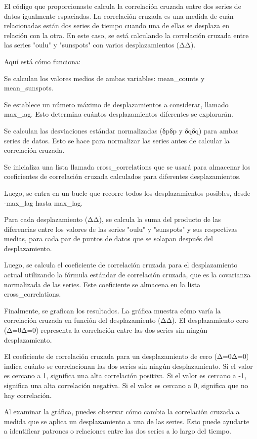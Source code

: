 El código que proporcionaste calcula la correlación cruzada entre dos series de datos igualmente espaciadas. La correlación cruzada es una medida de cuán relacionadas están dos series de tiempo cuando una de ellas se desplaza en relación con la otra. En este caso, se está calculando la correlación cruzada entre las series "oulu" y "sunspots" con varios desplazamientos (ΔΔ).

Aquí está cómo funciona:

    Se calculan los valores medios de ambas variables: mean_counts y mean_sunspots.

    Se establece un número máximo de desplazamientos a considerar, llamado max_lag. Esto determina cuántos desplazamientos diferentes se explorarán.

    Se calculan las desviaciones estándar normalizadas (δpδp​ y δqδq​) para ambas series de datos. Esto se hace para normalizar las series antes de calcular la correlación cruzada.

    Se inicializa una lista llamada cross_correlations que se usará para almacenar los coeficientes de correlación cruzada calculados para diferentes desplazamientos.

    Luego, se entra en un bucle que recorre todos los desplazamientos posibles, desde -max_lag hasta max_lag.

    Para cada desplazamiento (ΔΔ), se calcula la suma del producto de las diferencias entre los valores de las series "oulu" y "sunspots" y sus respectivas medias, para cada par de puntos de datos que se solapan después del desplazamiento.

    Luego, se calcula el coeficiente de correlación cruzada para el desplazamiento actual utilizando la fórmula estándar de correlación cruzada, que es la covarianza normalizada de las series. Este coeficiente se almacena en la lista cross_correlations.

    Finalmente, se grafican los resultados. La gráfica muestra cómo varía la correlación cruzada en función del desplazamiento (ΔΔ). El desplazamiento cero (Δ=0Δ=0) representa la correlación entre las dos series sin ningún desplazamiento.

El coeficiente de correlación cruzada para un desplazamiento de cero (Δ=0Δ=0) indica cuánto se correlacionan las dos series sin ningún desplazamiento. Si el valor es cercano a 1, significa una alta correlación positiva. Si el valor es cercano a -1, significa una alta correlación negativa. Si el valor es cercano a 0, significa que no hay correlación.

Al examinar la gráfica, puedes observar cómo cambia la correlación cruzada a medida que se aplica un desplazamiento a una de las series. Esto puede ayudarte a identificar patrones o relaciones entre las dos series a lo largo del tiempo.

